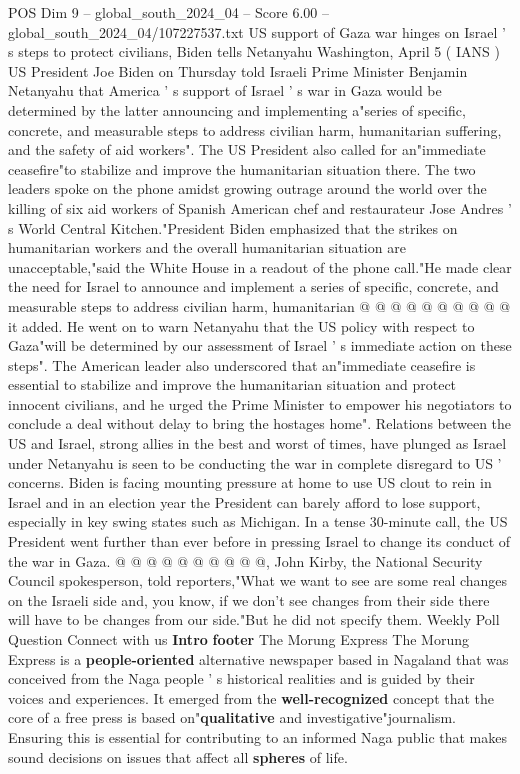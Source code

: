 \begin{textsample}{POS Dim 9 – global\_south\_2024\_04 – Score 6.00 – global\_south\_2024\_04/107227537.txt}  \label{ex:f9_pos_072}
US support of Gaza war hinges on Israel ' s steps to protect civilians, Biden tells Netanyahu Washington, April 5 ( IANS ) US President Joe Biden on Thursday told Israeli Prime Minister Benjamin Netanyahu that America ' s support of Israel ' s war in Gaza would be determined by the latter announcing and implementing a"series of specific, concrete, and measurable steps to address civilian harm, humanitarian suffering, and the safety of aid workers".
The US President also called for an"immediate ceasefire"to stabilize and improve the humanitarian situation there.
The two leaders spoke on the phone amidst growing outrage around the world over the killing of six aid workers of Spanish American chef and restaurateur Jose Andres ' s World Central Kitchen."President Biden emphasized that the strikes on humanitarian workers and the overall humanitarian situation are unacceptable,"said the White House in a readout of the phone call."He made clear the need for Israel to announce and implement a series of specific, concrete, and measurable steps to address civilian harm, humanitarian @ @ @ @ @ @ @ @ @ @ it added.
He went on to warn Netanyahu that the US policy with respect to Gaza"will be determined by our assessment of Israel ' s immediate action on these steps".
The American leader also underscored that an"immediate ceasefire is essential to stabilize and improve the humanitarian situation and protect innocent civilians, and he urged the Prime Minister to empower his negotiators to conclude a deal without delay to bring the hostages home".
Relations between the US and Israel, strong allies in the best and worst of times, have plunged as Israel under Netanyahu is seen to be conducting the war in complete disregard to US ' concerns.
Biden is facing mounting pressure at home to use US clout to rein in Israel and in an election year the President can barely afford to lose support, especially in key swing states such as Michigan.
In a tense 30-minute call, the US President went further than ever before in pressing Israel to change its conduct of the war in Gaza. @ @ @ @ @ @ @ @ @ @, John Kirby, the National Security Council spokesperson, told reporters,"What we want to see are some real changes on the Israeli side and, you know, if we don't see changes from their side there will have to be changes from our side."But he did not specify them.
Weekly Poll Question Connect with us \textbf{Intro} \textbf{footer} The Morung Express The Morung Express is a \textbf{people-oriented} alternative newspaper based in Nagaland that was conceived from the Naga people ' s historical realities and is guided by their voices and experiences.
It emerged from the \textbf{well-recognized} concept that the core of a free press is based on"\textbf{qualitative} and investigative"journalism.
Ensuring this is essential for contributing to an informed Naga public that makes sound decisions on issues that affect all \textbf{spheres} of life.

\end{textsample}
